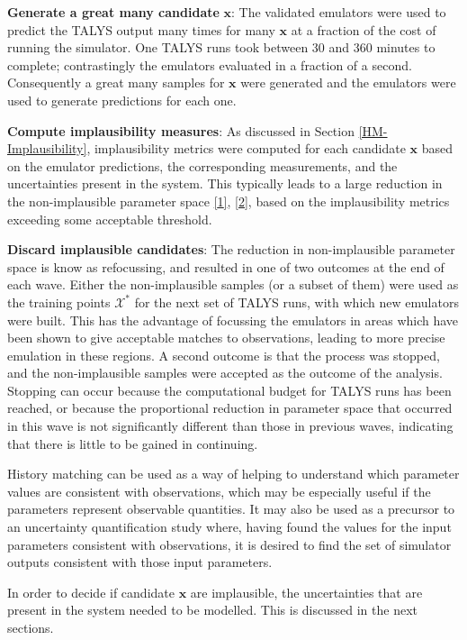 \documentclass[
  12pt,
  a4paper,
  twoside]{book}
\begin{document}
\textbf{Generate a great many candidate} \(\mathbf{x}\): The validated emulators were used to predict the TALYS output many times for many \(\mathbf{x}\) at a fraction of the cost of running the simulator. One TALYS runs took between 30 and 360 minutes to complete; contrastingly the emulators evaluated in a fraction of a second. Consequently a great many samples for \(\mathbf{x}\) were generated and the emulators were used to generate predictions for each one.

\textbf{Compute implausibility measures}: As discussed in Section \ref{HM-Implausibility}, implausibility metrics were computed for each candidate \(\mathbf{x}\) based on the emulator predictions, the corresponding measurements, and the uncertainties present in the system. This typically leads to a large reduction in the non-implausible parameter space \protect\hyperlink{ref-jeremy_histmatch}{{[}1{]}}, \protect\hyperlink{ref-bower2010galaxy}{{[}2{]}}, based on the implausibility metrics exceeding some acceptable threshold.

\textbf{Discard implausible candidates}: The reduction in non-implausible parameter space is know as refocussing, and resulted in one of two outcomes at the end of each wave. Either the non-implausible samples (or a subset of them) were used as the training points \(\mathcal{X}^*\) for the next set of TALYS runs, with which new emulators were built. This has the advantage of focussing the emulators in areas which have been shown to give acceptable matches to observations, leading to more precise emulation in these regions. A second outcome is that the process was stopped, and the non-implausible samples were accepted as the outcome of the analysis. Stopping can occur because the computational budget for TALYS runs has been reached, or because the proportional reduction in parameter space that occurred in this wave is not significantly different than those in previous waves, indicating that there is little to be gained in continuing.

History matching can be used as a way of helping to understand which parameter values are consistent with observations, which may be especially useful if the parameters represent observable quantities. It may also be used as a precursor to an uncertainty quantification study where, having found the values for the input parameters consistent with observations, it is desired to find the set of simulator outputs consistent with those input parameters.

In order to decide if candidate \(\mathbf{x}\) are implausible, the uncertainties that are present in the system needed to be modelled. This is discussed in the next sections.
\end{document}

